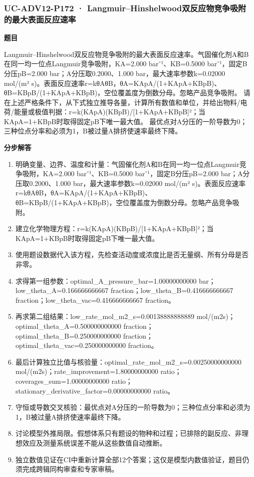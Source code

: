 \documentclass[UTF8,11pt,a4paper]{ctexart}
\begin{document}
\subsubsection*{UC-ADV12-P172 · Langmuir–Hinshelwood双反应物竞争吸附的最大表面反应速率}
\noindent\textbf{题目}\par
Langmuir–Hinshelwood双反应物竞争吸附的最大表面反应速率。气固催化剂A和B在同一均一位点Langmuir竞争吸附，KA=2.000 bar⁻¹、KB=0.5000 bar⁻¹，固定B分压pB=2.000 bar；A分压取0.2000、1.000 bar，最大速率参数k=0.02000 mol/(m² s)。表面反应速率r=kθAθB，θA=KApA/(1+KApA+KBpB)、θB=KBpB/(1+KApA+KBpB)，空位覆盖度为倒数分母。忽略产品竞争吸附。 请在上述严格条件下，从下式独立推导各量，计算所有数值和单位，并给出物料/电荷/能量或极值判据：r=k(KApA)(KBpB)/[1+KApA+KBpB]²；当KApA=1+KBpB时取得固定pB下唯一最大值。 最优点对A分压的一阶导数为0；三种位点分率和必须为1，B被过量A排挤使速率最终下降。\par
\medskip\noindent\textbf{分步解答}
\begin{enumerate}
\item 明确变量、边界、温度和计量：气固催化剂A和B在同一均一位点Langmuir竞争吸附，KA=2.000 bar⁻¹、KB=0.5000 bar⁻¹，固定B分压pB=2.000 bar；A分压取0.2000、1.000 bar，最大速率参数k=0.02000 mol/(m² s)。表面反应速率r=kθAθB，θA=KApA/(1+KApA+KBpB)、θB=KBpB/(1+KApA+KBpB)，空位覆盖度为倒数分母。忽略产品竞争吸附。
\item 建立化学物理方程：r=k(KApA)(KBpB)/[1+KApA+KBpB]²；当KApA=1+KBpB时取得固定pB下唯一最大值。
\item 使用题设数据代入该方程，先检查活动度或浓度比是否无量纲、所有分母是否非零。
\item 求得第一组参数：optimal\_A\_pressure\_bar=1.00000000000 bar；low\_theta\_A=0.166666666667 fraction；low\_theta\_B=0.416666666667 fraction；low\_theta\_vac=0.416666666667 fraction。
\item 再求第二组结果：low\_rate\_mol\_m2\_s=0.00138888888889 mol/(m2s)；optimal\_theta\_A=0.500000000000 fraction；optimal\_theta\_B=0.250000000000 fraction；optimal\_theta\_vac=0.250000000000 fraction。
\item 最后计算独立比值与核验量：optimal\_rate\_mol\_m2\_s=0.00250000000000 mol/(m2s)；rate\_improvement=1.80000000000 ratio；coverages\_sum=1.00000000000 ratio；stationary\_derivative\_factor=0.00000000000 ratio。
\item 守恒或导数交叉核验：最优点对A分压的一阶导数为0；三种位点分率和必须为1，B被过量A排挤使速率最终下降。
\item 讨论模型外推局限。假想体系只有题设的物种和过程；已排除的副反应、非理想效应及测量系统误差不能从这些数值自动推断。
\item 独立数值见证在CI中重新计算全部12个答案；这仅是模型内数值验证，题目仍须完成跨辑同构审查和专家审稿。
\end{enumerate}
\end{document}

